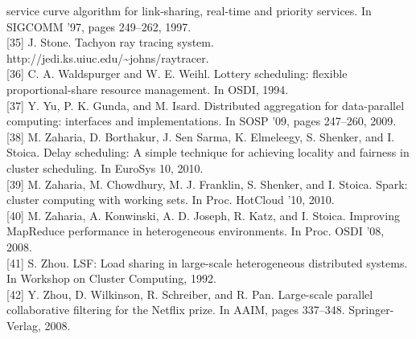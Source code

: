 \documentclass[
]{article}
\begin{document}
service curve algorithm for link-sharing, real-time and priority
services. In SIGCOMM '97, pages 249--262, 1997.\\
{[}35{]} J. Stone. Tachyon ray tracing system.
http://jedi.ks.uiuc.edu/\textasciitilde johns/raytracer.\\
{[}36{]} C. A. Waldspurger and W. E. Weihl. Lottery scheduling: flexible
proportional-share resource management. In OSDI, 1994.\\
{[}37{]} Y. Yu, P. K. Gunda, and M. Isard. Distributed aggregation for
data-parallel computing: interfaces and implementations. In SOSP '09,
pages 247--260, 2009.\\
{[}38{]} M. Zaharia, D. Borthakur, J. Sen Sarma, K. Elmeleegy, S.
Shenker, and I. Stoica. Delay scheduling: A simple technique for
achieving locality and fairness in cluster scheduling. In EuroSys 10,
2010.\\
{[}39{]} M. Zaharia, M. Chowdhury, M. J. Franklin, S. Shenker, and I.
Stoica. Spark: cluster computing with working sets. In Proc. HotCloud
'10, 2010.\\
{[}40{]} M. Zaharia, A. Konwinski, A. D. Joseph, R. Katz, and I. Stoica.
Improving MapReduce performance in heterogeneous environments. In Proc.
OSDI '08, 2008.\\
{[}41{]} S. Zhou. LSF: Load sharing in large-scale heterogeneous
distributed systems. In Workshop on Cluster Computing, 1992.\\
{[}42{]} Y. Zhou, D. Wilkinson, R. Schreiber, and R. Pan. Large-scale
parallel collaborative filtering for the Netflix prize. In AAIM, pages
337--348. Springer-Verlag, 2008.
\end{document}
